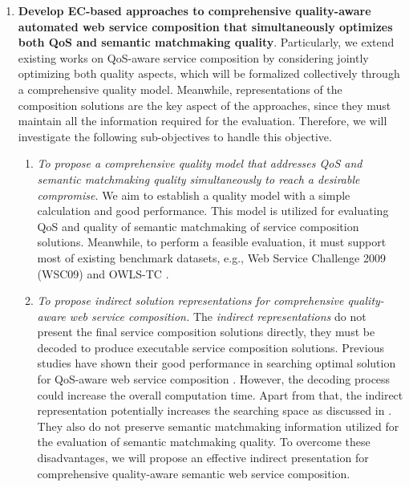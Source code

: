 \begin{enumerate}
  \item \label{Obj:1} \textbf{Develop EC-based approaches to comprehensive quality-aware automated web service composition that simultaneously optimizes both QoS and semantic matchmaking quality}. Particularly, we extend existing works on QoS-aware service composition by considering jointly optimizing both quality aspects, which will be formalized collectively through a comprehensive quality model. Meanwhile, representations of the composition solutions are the key aspect of the approaches, since they must maintain all the information required for the evaluation. Therefore, we will investigate the following sub-objectives to handle this objective.
  \begin{enumerate}
    \item \emph{To propose a comprehensive quality model that addresses QoS and semantic matchmaking quality simultaneously to reach a desirable compromise.} We aim to establish a quality model with a simple calculation and good performance. This model is utilized for evaluating QoS and quality of semantic matchmaking of service composition solutions. Meanwhile, to perform a feasible evaluation, it must support most of existing benchmark datasets, e.g., Web Service Challenge 2009 (WSC09)\cite{kona2009wsc} and OWLS-TC \cite{kuster2008opossum}.
    
    \item \emph{To propose indirect solution representations for comprehensive quality-aware web service composition.} The \emph{indirect representations} do not present the final service composition solutions directly, they must be decoded to produce executable service composition solutions. Previous studies have shown their good performance in searching optimal solution for QoS-aware web service composition \cite{da2016memetic,da2016particle}. However, the decoding process could increase the overall computation time. Apart from that, the indirect representation potentially increases the searching space as discussed in \cite{da2016particle}. They also do not preserve semantic matchmaking information utilized for the evaluation of semantic matchmaking quality. To overcome these disadvantages, we will propose an effective indirect presentation for comprehensive quality-aware semantic web service composition.


\end{enumerate}
\end{enumerate}
